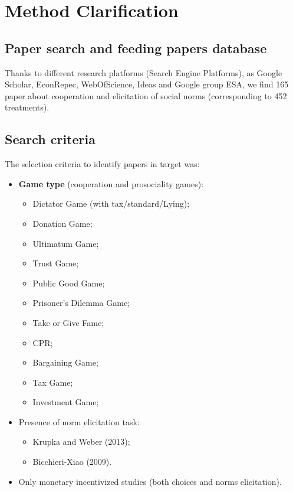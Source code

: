 \documentclass[
]{article}
\providecommand{\tightlist}{%
  \setlength{\itemsep}{0pt}\setlength{\parskip}{0pt}}
\begin{document}
\hypertarget{method-clarification}{%
\section{Method Clarification}\label{method-clarification}}

\hypertarget{paper-search-and-feeding-papers-database}{%
\subsection{Paper search and feeding papers
database}\label{paper-search-and-feeding-papers-database}}

Thanks to different research platforms (Search Engine Platforms), as
Google Scholar, EconRepec, WebOfScience, Ideas and Google group ESA, we
find 165 paper about cooperation and elicitation of social norms
(corresponding to 452 treatments).

\hypertarget{search-criteria}{%
\subsection{Search criteria}\label{search-criteria}}

The selection criteria to identify papers in target was:

\begin{itemize}
\tightlist
\item
  \textbf{Game type} (cooperation and prosociality games):

  \begin{itemize}
  \tightlist
  \item
    Dictator Game (with tax/standard/Lying);
  \item
    Donation Game;
  \item
    Ultimatum Game;
  \item
    Trust Game;
  \item
    Public Good Game;
  \item
    Prisoner's Dilemma Game;
  \item
    Take or Give Fame;
  \item
    CPR;
  \item
    Bargaining Game;
  \item
    Tax Game;
  \item
    Investment Game;
  \end{itemize}
\item
  Presence of norm elicitation task:

  \begin{itemize}
  \tightlist
  \item
    Krupka and Weber (2013);
  \item
    Bicchieri-Xiao (2009).
  \end{itemize}
\item
  Only monetary incentivized studies (both choices and norms
  elicitation).
\end{itemize}
\end{document}
